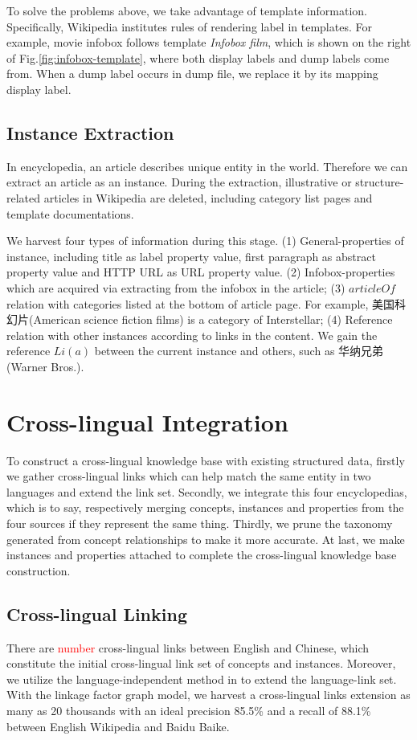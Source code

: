 \documentclass[runningheads,a4paper]{llncs}
\begin{document}
To solve the problems above, we take advantage of template information. Specifically, Wikipedia institutes rules of rendering label in templates. For example, movie infobox follows template \emph{Infobox film}, which is shown on the right of Fig.\ref{fig:infobox-template}, where both display labels and dump labels come from. When a dump label occurs in dump file, we replace it by its mapping display label. 

\subsection{Instance Extraction}
\label{sec:ie}
In encyclopedia, an article describes unique entity in the world. Therefore we can extract an article as an instance. During the extraction, illustrative or structure-related articles in Wikipedia are deleted, including category list pages and template documentations.

We harvest four types of information during this stage. (1) General-properties of instance, including title as label property value, first paragraph as abstract property value and HTTP URL as URL property value. (2) Infobox-properties which are acquired via extracting from the infobox in the article; (3) $articleOf$ relation with categories listed at the bottom of article page. For example, 美国科幻片(American science fiction films) is a category of Interstellar; (4) Reference relation with other instances according to links in the content. We gain the reference $Li(a)$ between the current instance and others, such as 华纳兄弟(Warner Bros.).

\section{Cross-lingual Integration}
\label{sec:clkbb}
To construct a cross-lingual knowledge base with existing structured data, firstly we gather cross-lingual links which can help match the same entity in two languages and extend the link set. Secondly, we integrate this four encyclopedias, which is to say, respectively merging concepts, instances and properties from the four sources if they represent the same thing. Thirdly, we prune the taxonomy generated from concept relationships to make it more accurate. At last, we make instances and properties attached to complete the cross-lingual knowledge base construction. 

\subsection{Cross-lingual Linking}
There are \textcolor{red}{number} cross-lingual links between English and Chinese, which constitute the initial cross-lingual link set of concepts and instances. Moreover, we utilize the language-independent method in \cite{wang2012cross} to extend the language-link set. With the linkage factor graph model, we harvest a cross-lingual links extension as many as 20 thousands with an ideal precision 85.5\% and a recall of 88.1\% between English Wikipedia and Baidu Baike.
\end{document}
